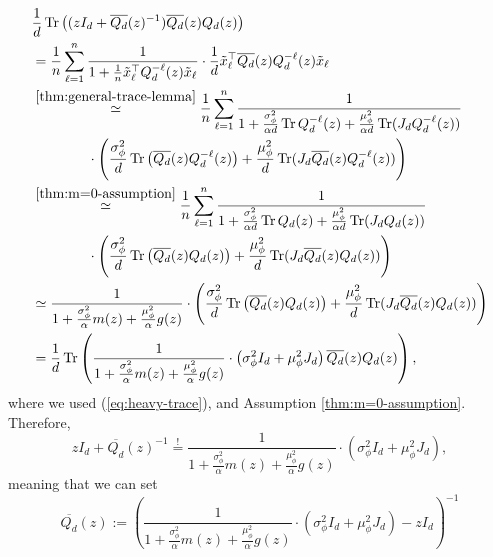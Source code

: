 \documentclass{article}
\begin{document}
\begin{align}
&\frac{1}{d}\operatorname{Tr}\left((zI_{d}+\overline{Q_{d}}(z)^{-1})\overline{Q_{d}}(z)Q_{d}(z)\right) \notag
\\&= \frac{1}{n}\sum_{\ell=1}^n\frac{1}{1+\frac{1}{n}\tilde{x}_\ell^\top Q_{d}^{-\ell}(z)\tilde{x}_\ell}\cdot\frac{1}{d}\tilde{x}_\ell^\top\overline{Q_{d}}(z)Q_{d}^{-\ell}(z)\tilde{x}_\ell \notag
\\ &\stackrel{\ref{thm:general-trace-lemma}}{\simeq}\frac{1}{n}\sum_{\ell=1}^n\frac{1}{1+\frac{\sigma_\phi^2}{\alpha d}\operatorname{Tr}Q_{d}^{-\ell}(z) + \frac{\mu_\phi^2}{\alpha d}\operatorname{Tr}(J_{d}Q_{d}^{-\ell}(z))} \notag
\\&\qquad\qquad\cdot\left(\frac{\sigma_\phi^2}{d}\operatorname{Tr}\left(\overline{Q_{d}}(z)Q_{d}^{-\ell}(z)\right) + \frac{\mu_\phi^2}{d}\operatorname{Tr}(J_{d}\overline{Q_{d}}(z)Q^{-\ell}_{d}(z))\right) \notag
\\ &\stackrel{\ref{thm:m=0-assumption}}{\simeq}\frac{1}{n}\sum_{\ell=1}^n\frac{1}{1+\frac{\sigma_\phi^2}{\alpha d}\operatorname{Tr}Q_{d}(z) + \frac{\mu_\phi^2}{\alpha d}\operatorname{Tr}(J_{d}Q_{d}(z))} \notag
\\&\qquad\qquad\cdot\left(\frac{\sigma_\phi^2}{d}\operatorname{Tr}\left(\overline{Q_{d}}(z)Q_{d}(z)\right) + \frac{\mu_\phi^2}{d}\operatorname{Tr}(J_{d}\overline{Q_{d}}(z)Q_{d}(z))\right) \notag
\\ &\simeq \frac{1}{1+\frac{\sigma_\phi^2}{\alpha }m(z) + \frac{\mu_\phi^2}{\alpha }g(z)}\cdot\left(\frac{\sigma_\phi^2}{d}\operatorname{Tr}\left(\overline{Q_{d}}(z)Q_{d}(z)\right) + \frac{\mu_\phi^2}{d}\operatorname{Tr}(J_{d}\overline{Q_{d}}(z)Q_{d}(z))\right) \notag
\\ &= \frac{1}{d}\operatorname{Tr}\left(\frac{1}{1+\frac{\sigma_\phi^2}{\alpha}m(z) + \frac{\mu_\phi^2}{\alpha}g(z)}\cdot\left(\sigma_\phi^2I_{d}+\mu_\phi^2J_{d}\right)\overline{Q_{d}}(z)Q_{d}(z)\right),
\end{align}
where we used (\ref{eq:heavy-trace}), and Assumption \ref{thm:m=0-assumption}. Therefore,
\begin{equation}
zI_{d}+\overline{Q_{d}}(z)^{-1}\stackrel{!}{=}\frac{1}{1+\frac{\sigma_\phi^2}{\alpha}m(z) + \frac{\mu_\phi^2}{\alpha}g(z)}\cdot\left(\sigma_\phi^2I_{d}+\mu_\phi^2J_{d}\right),
\end{equation}
meaning that we can set
\begin{equation}
\overline{Q_{d}}(z):=\left(\frac{1}{1+\frac{\sigma_\phi^2}{\alpha}m(z) + \frac{\mu_\phi^2}{\alpha}g(z)}\cdot\left(\sigma_\phi^2I_{d}+\mu_\phi^2J_{d}\right)-zI_{d}\right)^{-1}
\end{equation}
\end{document}
